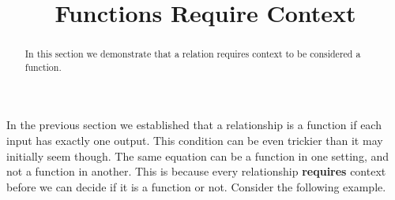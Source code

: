 \documentclass{ximera}
\title{Functions Require Context}
\begin{document}
\begin{abstract}
    In this section we demonstrate that a relation requires context to be considered a function.
\end{abstract}
\maketitle

    In the previous section we established that a relationship is a function if each input has exactly one output. This condition can be even trickier than it may initially seem though. The same equation can be a function in one setting, and not a function in another. This is because every relationship \textbf{requires} context before we can decide if it is a function or not. Consider the following example.
    
\end{document}
